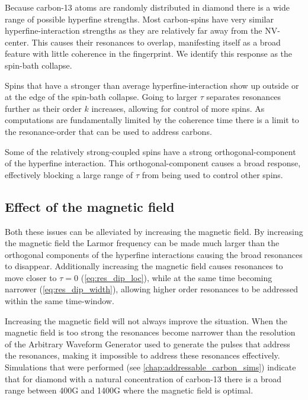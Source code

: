Because carbon-13 atoms are randomly distributed in diamond there is a wide range of possible hyperfine strengths.
Most carbon-spins have very similar hyperfine-interaction strengths as they are relatively far away from the NV-center. This causes their resonances to overlap, manifesting itself as a broad feature with little coherence in the fingerprint. We identify this response as the spin-bath collapse.

Spins that have a stronger than average hyperfine-interaction show up outside or at the edge of the spin-bath collapse. Going to larger $\tau$ separates resonances further as their order $k$ increases, allowing for control of more spins.
 As computations are fundamentally limited by the coherence time there is a limit to the resonance-order that can be used to address carbons.

  Some of the relatively strong-coupled spins have a strong orthogonal-component of the hyperfine interaction. This orthogonal-component causes a broad response, effectively blocking a large range of $\tau$ from being used to control other spins.

\subsection*{Effect of the magnetic field}
Both these issues can be alleviated by increasing the magnetic field.
By increasing the magnetic field the Larmor frequency can be made much larger than the orthogonal components of the hyperfine interactions causing the broad resonances to disappear.
Additionally increasing the magnetic field causes resonances to move closer to $\tau =0$ (\cref{eq:res_dip_loc}), while at the same time becoming narrower (\cref{eq:res_dip_width}), allowing higher order resonances to be addressed within the same time-window. %

Increasing the magnetic field will not always improve the situation. When the magnetic field is too strong the resonances become narrower than the resolution of the Arbitrary Waveform Generator used to generate the pulses that address the resonances, making it impossible to address these resonances effectively.
Simulations that were performed (see \cref{chap:addressable_carbon_sims}) indicate that for diamond with a natural concentration of carbon-13 there is a broad range between 400G and 1400G where the magnetic field is optimal.

